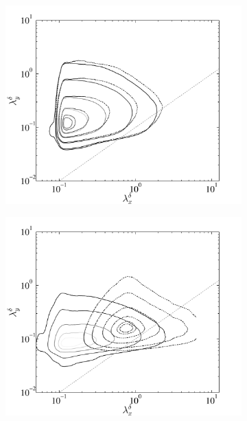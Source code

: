 \begin{figure}
        \centering
        \begin{subfigure}[t]{0.5\textwidth}
                \includegraphics[width=\linewidth]{Fig3/dissp_contour_ABL_n2n05_level5.pdf}
                \caption{}
                \label{fig:dissip2b}
        \end{subfigure}
 \centering
        \begin{subfigure}[t]{0.5\textwidth}
                \includegraphics[width=\linewidth]{Fig3/cospectra_contour_ABL_n2n05_level2.pdf}
                \caption{}

\end{subfigure}
\end{figure}
